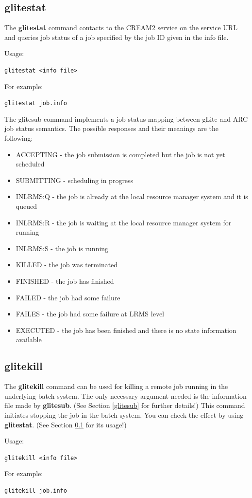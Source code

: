 \documentclass{article}
\begin{document}
\subsection{glitestat}
\label{glitestat}
The \textbf{glitestat} command contacts to the CREAM2 service on the service URL and queries job status of a job specified by the job ID given in the info file.\par
Usage:
\begin{shaded}\verb#glitestat <info file>#\end{shaded}
For example:
\begin{shaded}\verb#glitestat job.info#\end{shaded}
The glitesub command implements a job status mapping between gLite and ARC job status semantics. The possible responses and their meanings are the following:
\begin{itemize}
\item ACCEPTING - the job submission is completed but the job is not yet scheduled
\item SUBMITTING - scheduling in progress
\item INLRMS:Q - the job is already at the local resource manager system and it is queued
\item INLRMS:R - the job is waiting at the local resource manager system for running
\item INLRMS:S - the job is running
\item KILLED - the job was terminated
\item FINISHED - the job has finished
\item FAILED - the job had some failure
\item FAILES - the job had some failure at LRMS level
\item EXECUTED - the job has been finished and there is no state information available
\end{itemize}
\subsection{glitekill}
\label{glitekill}
The \textbf{glitekill} command can be used for killing a remote job running in the underlying batch system. The only necessary argument needed is the information file made by \textbf{glitesub}. (See Section \ref{glitesub} for further details!) This command initiates stopping the job in the batch system. You can check the effect by using \textbf{glitestat}. (See Section \ref{glitestat} for its usage!)\par
Usage:
\begin{shaded}\verb#glitekill <info file>#\end{shaded}
For example:
\begin{shaded}\verb#glitekill job.info#\end{shaded}
\end{document}
